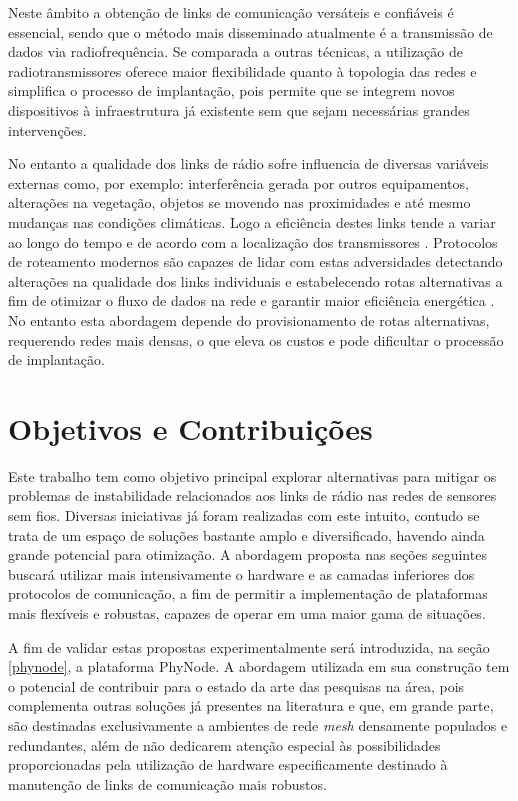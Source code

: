 \documentclass[
	12pt,				%
	openright,			%
	oneside,
	a4paper,			%
	english,			%
	french,				%
	spanish,			%
	brazil				%
	]{abntex2}
\begin{document}
Neste âmbito a obtenção de links de comunicação versáteis e confiáveis é essencial, sendo que o método mais disseminado atualmente é a transmissão de dados via radiofrequência. Se comparada a outras técnicas, a utilização de radiotransmissores oferece maior flexibilidade quanto à topologia das redes e simplifica o processo de implantação, pois permite que se integrem novos dispositivos à infraestrutura já existente sem que sejam necessárias grandes intervenções.

No entanto a qualidade dos links de rádio sofre influencia de diversas variáveis externas como, por exemplo: interferência gerada por outros equipamentos, alterações na vegetação, objetos se movendo nas proximidades e até mesmo mudanças nas condições climáticas. Logo a eficiência destes links tende a variar ao longo do tempo e de acordo com a localização dos transmissores \cite{Kusy2011}. Protocolos de roteamento modernos são capazes de lidar com estas adversidades detectando alterações na qualidade dos links individuais e estabelecendo rotas alternativas a fim de otimizar o fluxo de dados na rede e garantir maior eficiência energética \cite{Gnawali2009}. No entanto esta abordagem depende do provisionamento de rotas alternativas, requerendo redes mais densas, o que eleva os custos e pode dificultar o processão de implantação.

\section{Objetivos e Contribuições}
Este trabalho tem como objetivo principal explorar alternativas para mitigar os problemas de instabilidade relacionados aos links de rádio nas redes de sensores sem fios. Diversas iniciativas já foram realizadas com este intuito, contudo se trata de um espaço de soluções bastante amplo e diversificado, havendo ainda grande potencial para otimização. A abordagem proposta nas seções seguintes buscará utilizar mais intensivamente o hardware e as camadas inferiores dos protocolos de comunicação, a fim de permitir a implementação de plataformas mais flexíveis e robustas, capazes de operar em uma maior gama de situações. 

A fim de validar estas propostas experimentalmente será introduzida, na seção \ref{phynode}, a plataforma PhyNode. A abordagem utilizada em sua construção tem o potencial de contribuir para o estado da arte das pesquisas na área, pois complementa outras soluções já presentes na literatura \cite{Pantazis2013, Tarique2009} e que, em grande parte, são destinadas exclusivamente a ambientes de rede \textit{mesh} densamente populados e redundantes, além de não dedicarem atenção especial às possibilidades proporcionadas pela utilização de hardware especificamente destinado à manutenção de links de comunicação mais robustos.
\end{document}
